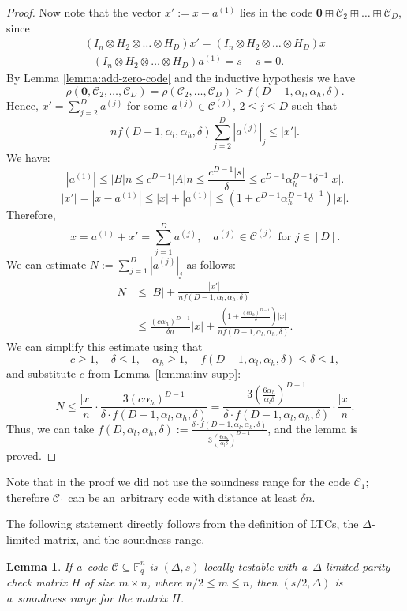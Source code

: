 \documentclass[conference]{IEEEtran}
\newcommand{\rbr}[1]{\left(#1\right)}
\let\le\leqslant
\let\ge\geqslant
\theoremstyle{plain}
\newtheorem{lemma}[theorem]{Lemma}
\theoremstyle{definition}
\theoremstyle{remark}
\newcommand{\cC}{\mathcal{C}}
\newcommand{\F}{\mathbb{F}}
\begin{document}
\begin{proof}
Now note that the vector $x':=x-a^{(1)}$ lies in the code $\mathbf{0}\boxplus \cC_2\boxplus\dots\boxplus \cC_D$, since \begin{multline*}
    (I_n\otimes H_2\otimes \dots\otimes H_D)x'=(I_n\otimes  H_2\otimes \dots\otimes H_D)x\\
    -(I_n\otimes H_2\otimes \dots\otimes H_D)a^{(1)}=s-s=0.
\end{multline*}
By Lemma \ref{lemma:add-zero-code} and the inductive hypothesis we have \[
    \rho(\mathbf{0},\cC_2,\dots, \cC_D)
    =\rho(\cC_2,\dots, \cC_D)
    \ge f(D-1,\alpha_l,\alpha_h,\delta).
\]
Hence, $x'=\sum_{j=2}^D a^{(j)}$ for some $a^{(j)}\in \cC^{(j)}$, $2\le j\le D$ such that \[
    n f(D-1,\alpha_l,\alpha_h,\delta)\sum_{j=2}^D |a^{(j)}|_j\le |x'|.
\]
We have: \[
    |a^{(1)}|
    \le |B|n
    \le c^{D-1}|A|n
    \le \frac{c^{D-1}|s|}{\delta}
    \le c^{D-1}\alpha_h^{D-1}\delta^{-1}|x|.
\] \[  
    |x'|=|x-a^{(1)}|
    \le |x|+|a^{(1)}|
    \le \rbr{1+c^{D-1}\alpha_h^{D-1}\delta^{-1}}|x|.
\]
Therefore, \[
    x=a^{(1)}+x'=\sum_{j=1}^D a^{(j)}, \quad 
    a^{(j)}\in \cC^{(j)}\mbox{ for }j\in [D].
\]
We can estimate $N:=\sum_{j=1}^D |a^{(j)}|_j$ as follows: 
\begin{align*}
    N &\le |B|+\frac{|x'|}{nf(D-1,\alpha_l,\alpha_h,\delta)}\\
    &\le \frac{(c\alpha_h)^{D-1}}{\delta  n}|x| + \frac{\rbr{1+\frac{(c\alpha_h)^{D-1}}{\delta}}|x|}{nf(D-1,\alpha_l,\alpha_h,\delta)}.
\end{align*}
We can simplify this estimate using that \[
c\ge 1,\quad \delta\le 1,\quad \alpha_h\ge 1,\quad f(D-1,\alpha_l,\alpha_h,\delta)\le\delta\le 1,
\]
and substitute $c$ from Lemma~\ref{lemma:inv-supp}:\[
    N\le \frac{|x|}{n}\cdot\frac{3(c\alpha_h)^{D-1}}{\delta\!\cdot\! f(D-1,\alpha_l,\alpha_h,\delta)}
    =\frac{3\rbr{\frac{6\alpha_h}{\alpha_l\delta}}^{D-1}}{\delta\!\cdot\! f(D-1,\alpha_l,\alpha_h,\delta)}\cdot \frac{|x|}{n}.
\]
Thus, we can take $f(D,\alpha_l,\alpha_h,\delta):=\frac{\delta \cdot f(D-1,\alpha_l,\alpha_h,\delta)}{3\rbr{\frac{6\alpha_h}{\alpha_l\delta}}^{D-1}}$, and the lemma is proved.
\end{proof}
Note that in the proof we did not use the soundness range for the code $\cC_1$; therefore $\cC_1$ can be an~arbitrary code with distance at least $\delta n$.


The following statement directly follows from the definition of LTCs, the $\Delta$-limited matrix, and the soundness range.

\begin{lemma}\label{lemma:LTC-exp}
    If a~code $\cC\subseteq \F_q^n$ is $(\Delta, s)$-locally testable with a~$\Delta$-limited parity-check matrix $H$ of size $m\times n$, where $n/2\le m\le n$, then $(s/2,\Delta)$ is a~soundness range for the matrix $H$.
\end{lemma}
\end{document}
